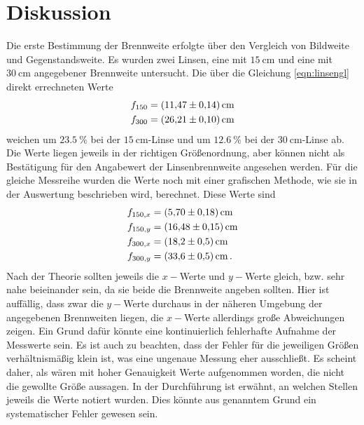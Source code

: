 \section{Diskussion}
\label{sec:Diskussion}

Die erste Bestimmung der Brennweite erfolgte über den Vergleich von Bildweite und Gegenstandsweite. Es wurden zwei Linsen, eine mit 
$\SI{15}{\cm} $ und eine mit $\SI{30}{\cm} $ angegebener Brennweite untersucht. Die über die Gleichung \ref{eqn:linsengl} direkt errechneten 
Werte 
\begin{align}
    f_{150} &= \SI{11.47+-0.14}{\centi\metre} \\
    f_{300} &= \SI{26.21+-0.10}{\centi\metre} 
\end{align}
weichen um $\SI{23.5}{\percent} $ bei der $\SI{15}{\cm}$-Linse und um $\SI{12.6}{\percent} $ bei der $\SI{30}{\cm}$-Linse ab.
Die Werte liegen jeweils in der richtigen Größenordnung, aber können nicht als Bestätigung für den Angabewert der Linsenbrennweite 
angesehen werden. Für die gleiche Messreihe wurden die Werte noch mit einer grafischen Methode, wie sie in der Auswertung beschrieben
wird, berechnet. Diese Werte sind 
\begin{align*}
    f_{150,x} &= \SI{5.70+-0.18}{\centi\metre} \\
    f_{150,y} &= \SI{16.48+-0.15}{\centi\metre} \\
    f_{300,x} &= \SI{18.2+-0.5}{\centi\metre} \\
    f_{300,y} &= \SI{33.6+-0.5}{\centi\metre} \, .
\end{align*}
Nach der Theorie sollten jeweils die $x-$Werte und $y-$Werte gleich, bzw. sehr nahe beieinander sein, da sie beide die Brennweite
angeben sollten. Hier ist auffällig, dass zwar die $y-$Werte durchaus in der näheren Umgebung der angegebenen Brennweiten
liegen, die $x-$Werte allerdings große Abweichungen zeigen. Ein Grund dafür könnte eine kontinuierlich fehlerhafte Aufnahme der 
Messwerte sein. Es ist auch zu beachten, dass der Fehler für die jeweiligen Größen verhältnismäßig klein ist, was eine ungenaue 
Messung eher ausschließt. Es scheint daher, als wären mit hoher Genauigkeit Werte aufgenommen worden, die nicht die gewollte 
Größe aussagen. In der Durchführung ist erwähnt, an welchen Stellen jeweils die Werte notiert wurden. Dies könnte aus genanntem 
Grund ein systematischer Fehler gewesen sein. 

